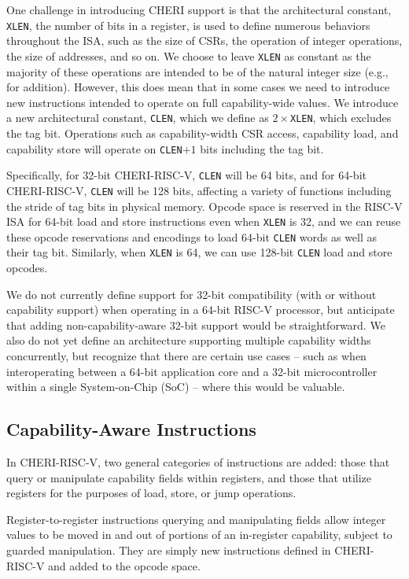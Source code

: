 One challenge in introducing CHERI support is that the architectural constant,
\texttt{XLEN}, the number of bits in a register, is used to define numerous
behaviors throughout the ISA, such as the size of CSRs, the operation of
integer operations, the size of addresses, and so on.
We choose to leave \texttt{XLEN} as constant as the majority of these operations
are intended to be of the natural integer size (e.g., for addition).
However, this does mean that in some cases we need to introduce new
instructions intended to operate on full capability-wide values.
We introduce a new architectural constant, \texttt{CLEN}, which we define as
$2\times$\texttt{XLEN}, which excludes the tag bit.
Operations such as capability-width CSR access, capability load, and capability
store will operate on \texttt{CLEN}$+1$ bits including the tag bit.

Specifically, for 32-bit CHERI-RISC-V, \texttt{CLEN} will be 64 bits, and for
64-bit CHERI-RISC-V, \texttt{CLEN} will be 128 bits, affecting a variety of
functions including the stride of tag bits in physical memory.
Opcode space is reserved in the RISC-V ISA for 64-bit load and store
instructions even when \texttt{XLEN} is 32, and we can reuse these opcode
reservations and encodings to load 64-bit \texttt{CLEN} words as well as
their tag bit.
Similarly, when \texttt{XLEN} is 64, we can use 128-bit \texttt{CLEN} load
and store opcodes.

We do not currently define support for 32-bit compatibility (with or without
capability support) when operating in a 64-bit RISC-V processor, but
anticipate that adding non-capability-aware 32-bit support would be
straightforward.
We also do not yet define an architecture supporting multiple capability
widths concurrently, but recognize that there are certain use cases -- such as
when interoperating between a 64-bit application core and a 32-bit
microcontroller within a single System-on-Chip (SoC) -- where this would be
valuable.

\subsection{Capability-Aware Instructions}

In CHERI-RISC-V, two general categories of instructions are added: those that
query or manipulate capability fields within registers, and those that
utilize registers for the purposes of load, store, or jump operations.

Register-to-register instructions querying and manipulating fields allow integer values to be moved in and
out of portions of an in-register capability, subject to guarded manipulation.
They are simply new instructions defined in CHERI-RISC-V and added to
the opcode space.

